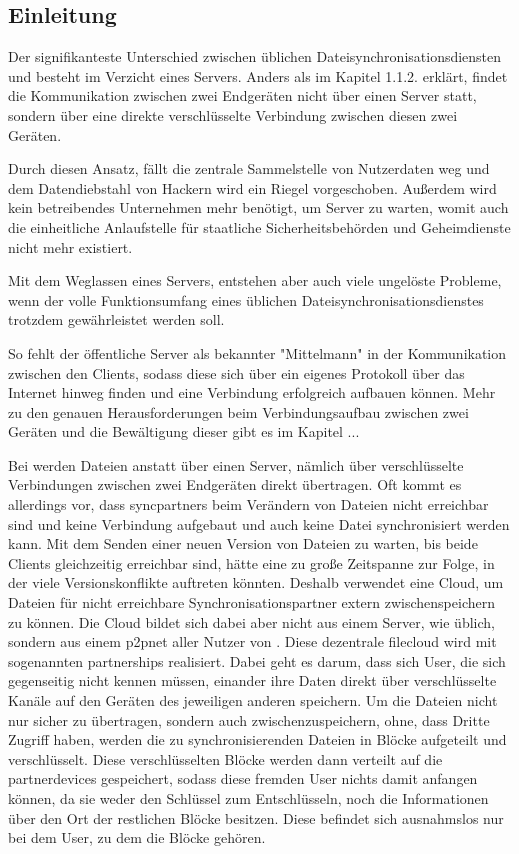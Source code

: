 \subsection{Einleitung}
Der signifikanteste Unterschied zwischen üblichen Dateisynchronisationsdiensten
und \sblit besteht im Verzicht eines Servers. Anders als im Kapitel 1.1.2. erklärt,
findet die Kommunikation zwischen zwei Endgeräten nicht über einen Server statt,
sondern über eine direkte verschlüsselte Verbindung zwischen diesen zwei Geräten.

Durch diesen Ansatz, fällt die zentrale Sammelstelle von Nutzerdaten
weg und dem Datendiebstahl von Hackern wird ein Riegel vorgeschoben. Außerdem
wird kein betreibendes Unternehmen mehr benötigt, um Server zu warten, womit auch
die einheitliche Anlaufstelle für staatliche Sicherheitsbehörden und Geheimdienste
nicht mehr existiert.

Mit dem Weglassen eines Servers, entstehen aber auch viele ungelöste Probleme,
wenn der volle Funktionsumfang eines üblichen Dateisynchronisationsdienstes
trotzdem gewährleistet werden soll.

So fehlt der öffentliche Server als bekannter "Mittelmann" in der Kommunikation
zwischen den Clients, sodass diese sich über ein eigenes Protokoll über das
Internet hinweg finden und eine Verbindung erfolgreich aufbauen können. Mehr zu
den genauen Herausforderungen beim Verbindungsaufbau zwischen zwei Geräten und
die Bewältigung dieser gibt es im Kapitel ...



Bei \sblit werden Dateien anstatt über einen Server, nämlich über verschlüsselte
Verbindungen zwischen zwei Endgeräten direkt übertragen.
Oft kommt es allerdings vor, dass \glspl{syncpartner} beim Verändern von
Dateien nicht erreichbar sind und keine Verbindung aufgebaut und auch
keine Datei synchronisiert werden kann.
Mit dem Senden einer neuen Version von Dateien zu warten,
bis beide Clients gleichzeitig erreichbar sind, hätte eine zu große Zeitspanne
zur Folge, in der viele Versionskonflikte auftreten könnten.
Deshalb verwendet \sblit eine Cloud, um Dateien für nicht erreichbare
Synchronisationspartner extern zwischenspeichern zu können. Die Cloud bildet
sich dabei aber nicht aus einem Server, wie üblich, sondern aus einem \gls{p2pnet}
aller Nutzer von \sblit. Diese dezentrale \gls{filecloud} wird
mit sogenannten \glspl{partnership} realisiert. Dabei geht es darum, dass sich
User, die sich gegenseitig nicht kennen müssen, einander ihre Daten direkt über
verschlüsselte Kanäle auf den Geräten des jeweiligen anderen speichern.
Um die Dateien nicht nur sicher zu übertragen, sondern auch zwischenzuspeichern,
ohne, dass Dritte Zugriff haben, werden die zu
synchronisierenden Dateien in Blöcke aufgeteilt und verschlüsselt. Diese
verschlüsselten Blöcke werden dann verteilt auf die \glspl{partnerdevice} gespeichert,
sodass diese fremden User nichts damit anfangen können, da sie weder den
Schlüssel zum Entschlüsseln, noch die Informationen über den Ort der restlichen
Blöcke besitzen. Diese befindet sich ausnahmslos nur bei dem User, zu dem die
Blöcke gehören.

